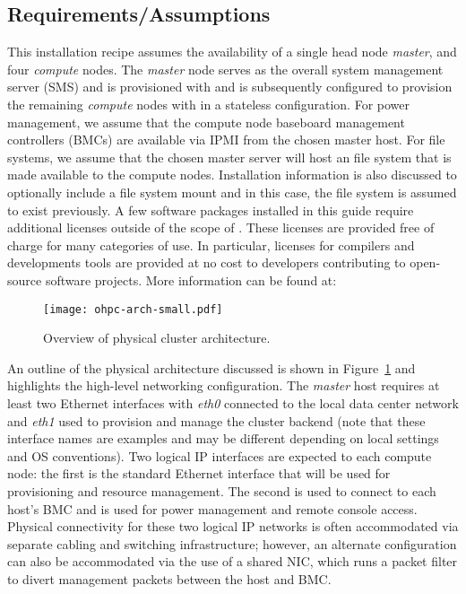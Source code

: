 \subsection{Requirements/Assumptions}
This installation recipe assumes the availability of a single head node {\em
  master}, and four {\em compute} nodes. The {\em master} node serves as the
overall system management server (SMS) and is provisioned with \baseOS{} and is
subsequently configured to provision the remaining {\em compute} nodes with
\Warewulf{} in a stateless configuration. For power management, we assume that
the compute node baseboard management controllers (BMCs) are available via IPMI
from the chosen master host. For file systems, we assume that the chosen master
server will host an \NFS{} file system that is made available to the compute
nodes. Installation information is also discussed to optionally include a
\Lustre{} file system mount and in this case, the \Lustre{} file system is
assumed to exist previously. A few \Intel{} software packages installed in this 
guide require additional licenses outside of the scope of \OHPC{}. These 
licenses are provided free of charge for many categories of use. In particular,
licenses for \Intel{} compilers and developments tools are provided at no cost
to developers contributing to open-source software projects. More information 
can be found at: \\

\noindent \href{https://software.intel.com/en-us/qualify-for-free-software}
	{\color{blue}{https://software.intel.com/en-us/qualify-for-free-software}}

\begin{figure}[hbt]
\center
\texttt{[image: ohpc-arch-small.pdf]}
\vspace*{-0.2cm}
\caption{Overview of physical cluster architecture.} \label{fig:physical_arch}
\end{figure}
\mbox{}

An outline of the physical architecture discussed is shown in
Figure~\ref{fig:physical_arch} and highlights the high-level networking
configuration. The {\em master} host requires at least two Ethernet interfaces
with {\em eth0} connected to the local data center network and {\em eth1} used
to provision and manage the cluster backend (note that these interface names
are examples and may be different depending on local settings and OS
conventions).  Two logical IP interfaces are expected to each compute node: the
first is the standard Ethernet interface that will be used for provisioning and
resource management. The second is used to connect to each host's BMC and is
used for power management and remote console access. Physical connectivity for
these two logical IP networks is often accommodated via separate cabling and
switching infrastructure; however, an alternate configuration can also be
accommodated via the use of a shared NIC, which runs a packet filter to divert
management packets between the host and BMC.

